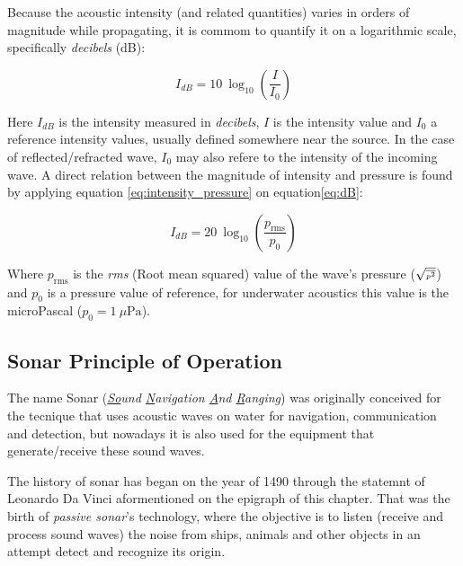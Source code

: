 

Because the acoustic intensity (and related quantities) varies in orders of
magnitude while propagating, it is commom to quantify it on a logarithmic scale,
specifically \textit{decibels} (dB)\cite{LURTON}:

\begin{equation}\label{eq:dB}
I_{dB} = 10~\log_{10}\left(\frac{I}{I_0}\right)
\end{equation} 

Here $I_{dB}$ is the intensity measured in \textit{decibels}, $I$ is the
intensity value and $I_0$ a reference intensity values, usually defined somewhere near the
source. In the case of reflected/refracted wave, $I_0$ may also refere to
the intensity of the incoming wave. A direct relation between the magnitude of
intensity and pressure is found by applying equation \ref{eq:intensity_pressure}
on equation\ref{eq:dB}:

\begin{equation}\label{eq:dB}
I_{dB} = 20~\log_{10}\left(\frac{p_{\text{rms}}}{p_0}\right)
\end{equation}

Where $p_{\text{rms}}$ is the \textit{rms} (Root mean squared) value of the
wave's pressure ({\small $\sqrt{\text{\tiny \(\overline{p^2}\)}}$}) and $p_0$ is
a pressure value of reference, for underwater acoustics this value is the
microPascal (\(p_0 = 1~\mu\text{Pa} \))\cite{LURTON}.


\subsection{Sonar Principle of Operation}

The name Sonar (\textit{\underline{So}und \underline{N}avigation \underline{A}nd
\underline{R}anging}) was originally conceived for the tecnique that uses
acoustic waves on water for navigation, communication and detection, but
nowadays it is also used for the equipment that generate/receive these
sound waves.

The history of sonar has began on the year of 1490 through
the statemnt of Leonardo Da Vinci aformentioned on the epigraph 
of this chapter\cite{fahy1998fundamentals}. That was the birth of
\textit{passive sonar}'s technology, where the objective is to listen (receive
and process sound waves) the noise from ships, animals and other objects in an attempt detect and
recognize its origin.

